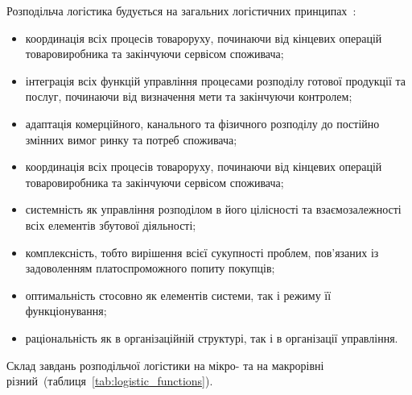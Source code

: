 Розподільча логістика будується на загальних логістичних принципах~\cite{Anikin1999}:
\begin{itemize}
	\item координація всіх процесів товароруху, починаючи від кінцевих операцій товаровиробника та закінчуючи сервісом споживача;
	\item інтеграція всіх функцій управління процесами розподілу готової продукції та послуг, починаючи від визначення мети та закінчуючи контролем;
	\item адаптація комерційного, канального та фізичного розподілу до постійно змінних вимог ринку та потреб споживача;
	\item координація всіх процесів товароруху, починаючи від кінцевих операцій товаровиробника та закінчуючи сервісом споживача;
	\item системність як управління розподілом в його цілісності та взаємозалежності всіх елементів збутової діяльності;
	\item комплексність, тобто вирішення всієї сукупності проблем, пов’язаних із задоволенням платоспроможного попиту покупців;
	\item оптимальність стосовно як елементів системи, так і режиму її функціонування;
	\item раціональність як в організаційній структурі, так і в організації управління.
\end{itemize}

Склад завдань розподільчої логістики на мікро- та на макрорівні різний~(таблиця~\ref{tab:logistic_functions}).

